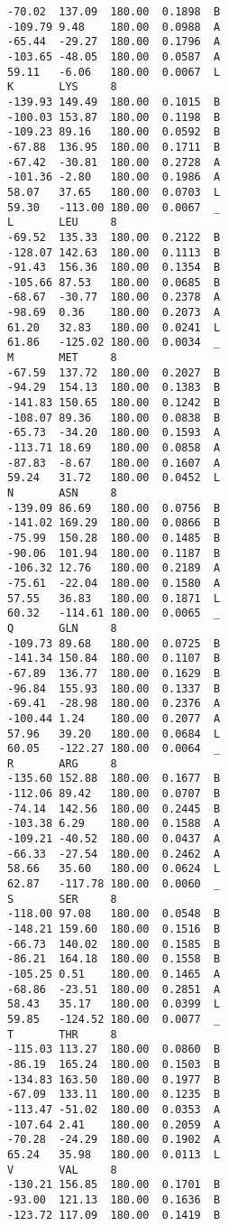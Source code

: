 \begin{small}
\begin{verbatim}
-70.02  137.09  180.00  0.1898  B
-109.79 9.48    180.00  0.0988  A
-65.44  -29.27  180.00  0.1796  A
-103.65 -48.05  180.00  0.0587  A
59.11   -6.06   180.00  0.0067  L
K       LYS     8
-139.93 149.49  180.00  0.1015  B
-100.03 153.87  180.00  0.1198  B
-109.23 89.16   180.00  0.0592  B
-67.88  136.95  180.00  0.1711  B
-67.42  -30.81  180.00  0.2728  A
-101.36 -2.80   180.00  0.1986  A
58.07   37.65   180.00  0.0703  L
59.30   -113.00 180.00  0.0067  _
L       LEU     8
-69.52  135.33  180.00  0.2122  B
-128.07 142.63  180.00  0.1113  B
-91.43  156.36  180.00  0.1354  B
-105.66 87.53   180.00  0.0685  B
-68.67  -30.77  180.00  0.2378  A
-98.69  0.36    180.00  0.2073  A
61.20   32.83   180.00  0.0241  L
61.86   -125.02 180.00  0.0034  _
M       MET     8
-67.59  137.72  180.00  0.2027  B
-94.29  154.13  180.00  0.1383  B
-141.83 150.65  180.00  0.1242  B
-108.07 89.36   180.00  0.0838  B
-65.73  -34.20  180.00  0.1593  A
-113.71 18.69   180.00  0.0858  A
-87.83  -8.67   180.00  0.1607  A
59.24   31.72   180.00  0.0452  L
N       ASN     8
-139.09 86.69   180.00  0.0756  B
-141.02 169.29  180.00  0.0866  B
-75.99  150.28  180.00  0.1485  B
-90.06  101.94  180.00  0.1187  B
-106.32 12.76   180.00  0.2189  A
-75.61  -22.04  180.00  0.1580  A
57.55   36.83   180.00  0.1871  L
60.32   -114.61 180.00  0.0065  _
Q       GLN     8
-109.73 89.68   180.00  0.0725  B
-141.34 150.84  180.00  0.1107  B
-67.89  136.77  180.00  0.1629  B
-96.84  155.93  180.00  0.1337  B
-69.41  -28.98  180.00  0.2376  A
-100.44 1.24    180.00  0.2077  A
57.96   39.20   180.00  0.0684  L
60.05   -122.27 180.00  0.0064  _
R       ARG     8
-135.60 152.88  180.00  0.1677  B
-112.06 89.42   180.00  0.0707  B
-74.14  142.56  180.00  0.2445  B
-103.38 6.29    180.00  0.1588  A
-109.21 -40.52  180.00  0.0437  A
-66.33  -27.54  180.00  0.2462  A
58.66   35.60   180.00  0.0624  L
62.87   -117.78 180.00  0.0060  _
S       SER     8
-118.00 97.08   180.00  0.0548  B
-148.21 159.60  180.00  0.1516  B
-66.73  140.02  180.00  0.1585  B
-86.21  164.18  180.00  0.1558  B
-105.25 0.51    180.00  0.1465  A
-68.86  -23.51  180.00  0.2851  A
58.43   35.17   180.00  0.0399  L
59.85   -124.52 180.00  0.0077  _
T       THR     8
-115.03 113.27  180.00  0.0860  B
-86.19  165.24  180.00  0.1503  B
-134.83 163.50  180.00  0.1977  B
-67.09  133.11  180.00  0.1235  B
-113.47 -51.02  180.00  0.0353  A
-107.64 2.41    180.00  0.2059  A
-70.28  -24.29  180.00  0.1902  A
65.24   35.98   180.00  0.0113  L
V       VAL     8
-130.21 156.85  180.00  0.1701  B
-93.00  121.13  180.00  0.1636  B
-123.72 117.09  180.00  0.1419  B

\end{verbatim}
\end{small}
